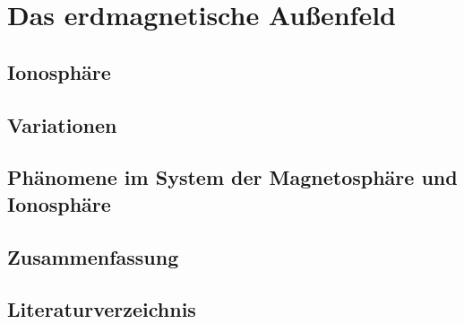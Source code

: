 \documentclass[
  a4paper,
  DIV=11]{scrreprt}
\begin{document}
\part{Das erdmagnetische Außenfeld}

\hypertarget{ionosphuxe4re}{%
\chapter{Ionosphäre}\label{ionosphuxe4re}}

\hypertarget{variationen}{%
\chapter{Variationen}\label{variationen}}


\hypertarget{phuxe4nomene-im-system-der-magnetosphuxe4re-und-ionosphuxe4re}{%
\chapter{Phänomene im System der Magnetosphäre und
Ionosphäre}\label{phuxe4nomene-im-system-der-magnetosphuxe4re-und-ionosphuxe4re}}


\hypertarget{zusammenfassung-1}{%
\chapter{Zusammenfassung}\label{zusammenfassung-1}}


\hypertarget{literaturverzeichnis}{%
\chapter*{Literaturverzeichnis}\label{literaturverzeichnis}}

\end{document}

